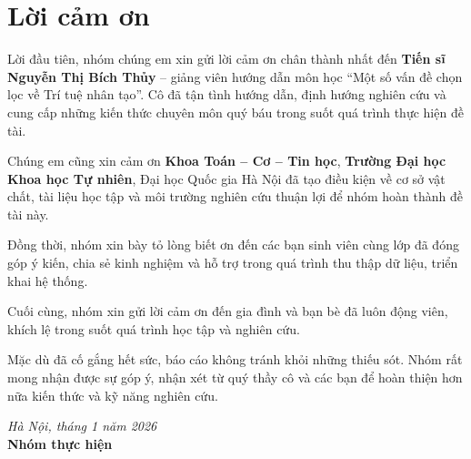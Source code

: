 ﻿\chapter*{Lời cảm ơn}

Lời đầu tiên, nhóm chúng em xin gửi lời cảm ơn chân thành nhất đến \textbf{Tiến sĩ Nguyễn Thị Bích Thủy} -- giảng viên hướng dẫn môn học ``Một số vấn đề chọn lọc về Trí tuệ nhân tạo''. Cô đã tận tình hướng dẫn, định hướng nghiên cứu và cung cấp những kiến thức chuyên môn quý báu trong suốt quá trình thực hiện đề tài.

Chúng em cũng xin cảm ơn \textbf{Khoa Toán -- Cơ -- Tin học}, \textbf{Trường Đại học Khoa học Tự nhiên}, Đại học Quốc gia Hà Nội đã tạo điều kiện về cơ sở vật chất, tài liệu học tập và môi trường nghiên cứu thuận lợi để nhóm hoàn thành đề tài này.

Đồng thời, nhóm xin bày tỏ lòng biết ơn đến các bạn sinh viên cùng lớp đã đóng góp ý kiến, chia sẻ kinh nghiệm và hỗ trợ trong quá trình thu thập dữ liệu, triển khai hệ thống.

Cuối cùng, nhóm xin gửi lời cảm ơn đến gia đình và bạn bè đã luôn động viên, khích lệ trong suốt quá trình học tập và nghiên cứu.

Mặc dù đã cố gắng hết sức, báo cáo không tránh khỏi những thiếu sót. Nhóm rất mong nhận được sự góp ý, nhận xét từ quý thầy cô và các bạn để hoàn thiện hơn nữa kiến thức và kỹ năng nghiên cứu.

\vspace{1cm}
\begin{flushright}
\textit{Hà Nội, tháng 1 năm 2026}\\
\textbf{Nhóm thực hiện}
\end{flushright}
